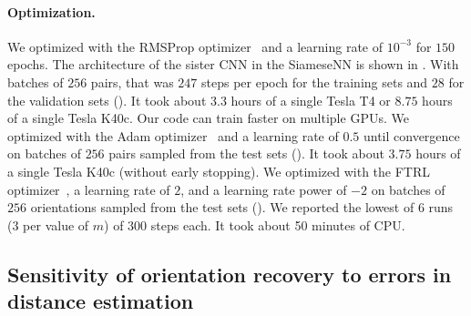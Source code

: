 \paragraph{Optimization.}
We optimized  with the RMSProp optimizer~\cite{tieleman2012rmsprop} and a learning rate of $10^{-3}$ for $150$ epochs.
The architecture of the sister CNN in the SiameseNN is shown in .
With batches of $256$ pairs, that was $247$ steps per epoch for the training sets and $28$ for the validation sets ().
It took about $3.3$ hours of a single Tesla T4 or $8.75$ hours of a single Tesla K40c. Our code can train faster on multiple GPUs.
We optimized  with the Adam optimizer~\cite{kingma2014adam} and a learning rate of $0.5$ until convergence on batches of $256$ pairs sampled from the test sets ().
It took about $3.75$ hours of a single Tesla K40c (without early stopping).
We optimized  with the FTRL optimizer~\cite{mcmahan2013ftrl}, a learning rate of $2$, and a learning rate power of $-2$ on batches of $256$ orientations sampled from the test sets ().
We reported the lowest of 6 runs (3 per value of $m$) of 300 steps each.
It took about 50 minutes of CPU.


\subsection{Sensitivity of orientation recovery to errors in distance estimation}\label{sec:results:orientation-recovery:sensitivity}


